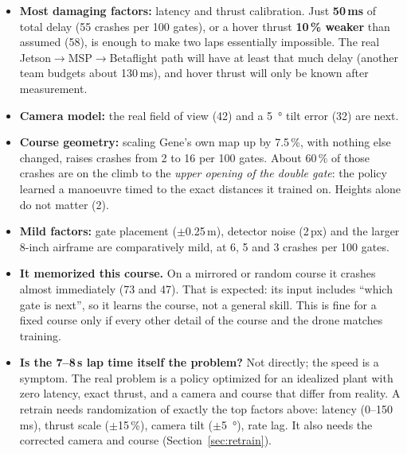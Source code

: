 \begin{verdict}
\begin{itemize}
\item \textbf{Most damaging factors:} latency and thrust calibration. Just \textbf{50\,ms} of total delay (55 crashes per 100 gates), or a hover thrust \textbf{10\,\% weaker} than assumed (58), is enough to make two laps essentially impossible. The real Jetson$\rightarrow$MSP$\rightarrow$Betaflight path will have at least that much delay (another team budgets about 130\,ms), and hover thrust will only be known after measurement.
\item \textbf{Camera model:} the real field of view (42) and a \SI{5}{\degree} tilt error (32) are next.
\item \textbf{Course geometry:} scaling Gene's own map up by 7.5\,\%, with nothing else changed, raises crashes from 2 to 16 per 100 gates. About 60\,\% of those crashes are on the climb to the \emph{upper opening of the double gate}: the policy learned a manoeuvre timed to the exact distances it trained on. Heights alone do not matter (2).
\item \textbf{Mild factors:} gate placement ($\pm$0.25\,m), detector noise (2\,px) and the larger 8-inch airframe are comparatively mild, at 6, 5 and 3 crashes per 100 gates.
\item \textbf{It memorized this course.} On a mirrored or random course it crashes almost immediately (73 and 47). That is expected: its input includes ``which gate is next'', so it learns the course, not a general skill. This is fine for a fixed course only if every other detail of the course and the drone matches training.
\item \textbf{Is the 7--8\,s lap time itself the problem?} Not directly; the speed is a symptom. The real problem is a policy optimized for an idealized plant with zero latency, exact thrust, and a camera and course that differ from reality. A retrain needs randomization of exactly the top factors above: latency (0--150\,ms), thrust scale ($\pm$15\,\%), camera tilt ($\pm$\SI{5}{\degree}), rate lag. It also needs the corrected camera and course (Section~\ref{sec:retrain}).
\end{itemize}
\end{verdict}
